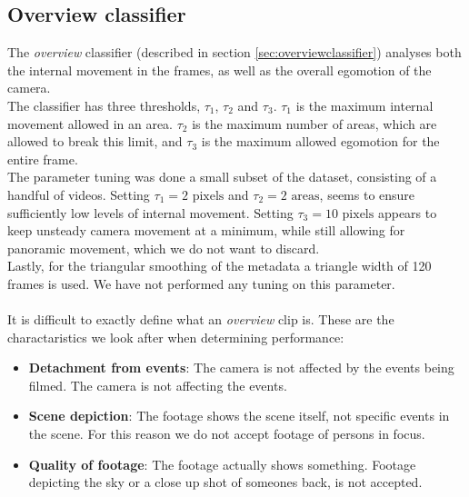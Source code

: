 \subsection{Overview classifier}
%
The \textit{overview} classifier (described in section \ref{sec:overviewclassifier}) analyses both the internal movement in the frames, as well as the overall egomotion of the camera.\\
The classifier has three thresholds, $\tau_{1}$, $\tau_{2}$ and $\tau_{3}$. $\tau_{1}$ is the maximum internal movement allowed in an area. $\tau_{2}$ is the maximum number of areas, which are allowed to break this limit, and $\tau_{3}$ is the maximum allowed egomotion for the entire frame.\\
The parameter tuning was done a small subset of the dataset, consisting of a handful of videos. Setting $\tau_{1} = 2 \text{ pixels}$ and $\tau_{2} = 2 \text{ areas}$, seems to ensure sufficiently low levels of internal movement. Setting $\tau_{3} = 10 \text{ pixels}$ appears to keep unsteady camera movement at a minimum, while still allowing for panoramic movement, which we do not want to discard.\\
Lastly, for the triangular smoothing of the metadata a triangle width of 120 frames is used. We have not performed any tuning on this parameter.\\
\\
It is difficult to exactly define what an \textit{overview} clip is. These are the charactaristics we look after when determining performance:
%
\begin{itemize}
	\item \textbf{Detachment from events}: The camera is not affected by the events being filmed. The camera is not affecting the events.
	\item \textbf{Scene depiction}: The footage shows the scene itself, not specific events in the scene. For this reason we do not accept footage of persons in focus.
	\item \textbf{Quality of footage}: The footage actually shows something. Footage depicting the sky or a close up shot of someones back, is not accepted.
\end{itemize}

